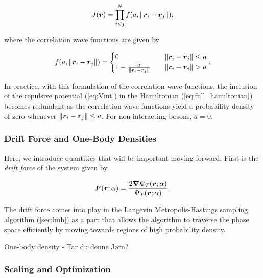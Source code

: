 \begin{equation}\label{eq:jastrow_factor}
    J \qty(\bm{r}) = \prod_{i<j}^N f \qty(a, \norm{\bm{r}_i - \bm{r}_j}),
\end{equation}

where the correlation wave functions are given by

\begin{equation}\label{eq:corr_wf}
    f \qty(a, \norm{\bm{r}_i - \bm{r}_j}) = 
    \begin{cases}
        0 \quad &\norm{\bm{r}_i - \bm{r}_j} \leq a
        \\
        1 - \frac{a}{\norm{\bm{r}_i - \bm{r}_j}} \quad &\norm{\bm{r}_i - \bm{r}_j} > a
    \end{cases}.
\end{equation}

In practice, with this formulation of the correlation wave functions, the inclusion of the repulsive potential (\autoref{eq:Vint}) in the Hamiltonian (\autoref{eq:full_hamiltonian}) becomes redundant as the correlation wave functions yield a probability density of zero whenever $\norm{\bm{r}_i - \bm{r}_j} \leq a$. For non-interacting bosons, $a=0$. 


\subsubsection{Drift Force and One-Body Densities}

Here, we introduce quantities that will be important moving forward. First is the \textit{drift force} of the system given by

\begin{equation}\label{eq:drift_force}
    \bm{F} \qty(\bm{r}; \alpha) = \frac{2 \grad \Psi_T \qty(\bm{r}; \alpha)}{\Psi_T \qty(\bm{r}; \alpha)}.
\end{equation}

The drift force comes into play in the Langevin Metropolis-Hastings sampling algorithm (\autoref{sec:lmh}) as a part that allows the algorithm to traverse the phase space efficiently by moving towards regions of high probability density.


One-body density - Tar du denne Jørn?


\subsubsection{Scaling and Optimization}\label{sec:Theory_scaling_and_opt}

